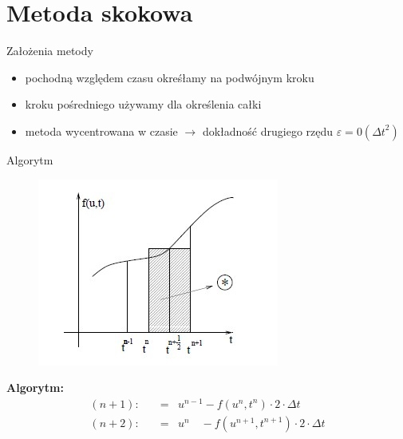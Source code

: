 \section{Metoda skokowa}
\begin{frame}{Założenia metody}
	\begin{itemize}
	\item pochodną względem czasu okreśłamy na podwójnym kroku
    \item kroku pośredniego używamy dla określenia całki
    \item metoda wycentrowana w czasie $\rightarrow $ dokładność drugiego rzędu $\varepsilon = 0({\Delta t}^2)$
	\end{itemize}
\end{frame}
\begin{frame}{Algorytm}
	\begin{figure}
	\includegraphics[height=0.5\textheight]{img/metoda_skokowa.jpg}
	\end{figure}
    \textbf{Algorytm:}
    $$ \begin{array}{rcl}
      (n+1):\quad &=&u^{n-1} -f(u^n,t^n)\cdot 2 \cdot \Delta t\\
      (n+2):\quad &=&u^n \quad -f(u^{n+1},t^{n+1})\cdot 2 \cdot \Delta t
      \end{array} $$
    
\end{frame}

